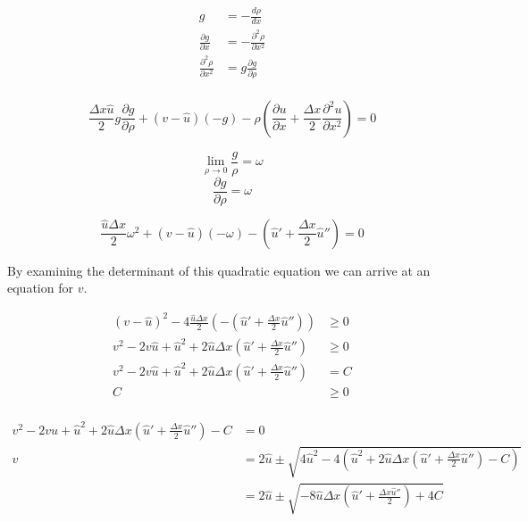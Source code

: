 \documentclass[a4paper]{article}
\begin{document}
\begin{align*}
g & = - \frac{d \rho}{d x} \\
\frac{\partial g}{\partial x} & = - \frac{\partial ^2 \rho}{\partial x ^2 } \\
\frac{\partial ^2 \rho}{\partial x^2} &= g \frac{\partial g}{\partial \rho} \\
\end{align*}

\begin{equation}
\frac{\Delta x \hat{u}}{2} g \frac{\partial g}{\partial \rho} + ( v - \hat{u} ) (-g) - \rho \left( \frac{\partial u}{\partial x} + \frac{\Delta x}{2} \frac{\partial ^2 u}{\partial x ^2 } \right)  = 0 
\end{equation}

$$\lim _{\rho \rightarrow 0} \frac{g}{\rho} = \omega $$
$$ \frac{\partial g}{\partial \rho} = \omega $$

\begin{equation}
\frac{\hat{u} \Delta x }{2} \omega ^2 + ( v - \hat{u} ) ( - \omega ) - \left( \hat{u} ' + \frac{\Delta x}{2} \hat{u}'' \right) = 0 
\end{equation}

By examining the determinant of this quadratic equation we can arrive at an equation for $v$. 

\begin{align*}
(v - \hat{u} )^2 - 4 \frac{\hat{u} \Delta x}{2} \left( - \left( \hat{u} ' + \frac{\Delta x}{2} \hat{u}'' \right) \right) & \geq 0 \\
v ^2   - 2 v \hat{u} + \hat{u} ^2 + 2 \hat{u} \Delta x \left( \hat{u} ' + \frac{\Delta x}{2} \hat{u} '' \right) & \geq 0 \\
v ^2   - 2 v \hat{u} + \hat{u} ^2 + 2 \hat{u} \Delta x \left( \hat{u} ' + \frac{\Delta x}{2} \hat{u} '' \right) & = C \\
C &  \geq 0 \\
\end{align*}

\begin{align*}
v ^2   - 2 v \hat{u} + \hat{u} ^2 + 2 \hat{u} \Delta x \left( \hat{u} ' + \frac{\Delta x}{2} \hat{u} '' \right) - C & = 0 \\
v & = 2 \hat{u} \pm \sqrt{4 \hat{u} ^ 2 - 4 \left( \hat{u} ^2 + 2 \hat{u} \Delta x \left( \hat{u} ' + \frac{\Delta x}{2} \hat{u} '' \right) - C \right) }\\
&= 2 \hat{u} \pm \sqrt{-8 \hat{u} \Delta x \left( \hat{u} ' + \frac{\Delta x \hat{u} ''}{2 } \right) + 4 C}
\end{align*}
\end{document}
